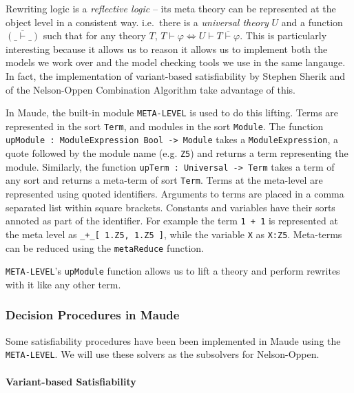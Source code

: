 \documentclass[]{article}
\let\oldparagraph\paragraph
\renewcommand{\paragraph}[1]{\oldparagraph{#1}\mbox{}}
\renewcommand \phi {\varphi}
\newcommand \proves   {{\vdash}}
\begin{document}
Rewriting logic is a \emph{reflective logic} -- its meta theory can be
represented at the object level in a consistent way. i.e.~there is a
\emph{universal theory} \(U\) and a function
\(\overline { ( \_ \proves \_ ) }\) such that for any theory \(T\),
\(T \proves \phi \iff U \proves \overline{ T \proves \phi }\). This is
particularly interesting because it allows us to reason it allows us to
implement both the models we work over and the model checking tools we
use in the same langauge. In fact, the implementation of variant-based
satisfiability by Stephen Sherik and of the Nelson-Oppen Combination
Algorithm take advantage of this.

In Maude, the built-in module \texttt{META-LEVEL} is used to do this
lifting. Terms are represented in the sort \texttt{Term}, and modules in
the sort \texttt{Module}. The function
\texttt{upModule\ :\ ModuleExpression\ Bool\ -\textgreater{}\ Module}
takes a \texttt{ModuleExpression}, a quote followed by the module name
(e.g. \texttt{\textquotesingle{}Z5}) and returns a term representing the
module. Similarly, the function
\texttt{upTerm\ :\ Universal\ -\textgreater{}\ Term} takes a term of any
sort and returns a meta-term of sort \texttt{Term}. Terms at the
meta-level are represented using quoted identifiers. Arguments to terms
are placed in a comma separated list within square brackets. Constants
and variables have their sorts annoted as part of the identifier. For
example the term \texttt{1\ +\ 1} is represented at the meta level as
\texttt{\textquotesingle{}\_+\_{[}\ \textquotesingle{}1.Z5,\ \textquotesingle{}1.Z5\ {]}},
while the variable \texttt{X} as \texttt{\textquotesingle{}X:Z5}.
Meta-terms can be reduced using the \texttt{metaReduce} function.

\texttt{META-LEVEL}'s \texttt{upModule} function allows us to lift a
theory and perform rewrites with it like any other term.

\hypertarget{decision-procedures-in-maude}{%
\subsubsection{Decision Procedures in
Maude}\label{decision-procedures-in-maude}}

Some satisfiability procedures have been been implemented in Maude using
the \texttt{META-LEVEL}. We will use these solvers as the subsolvers for
Nelson-Oppen.

\hypertarget{variant-based-satisfiability}{%
\paragraph{Variant-based
Satisfiability}\label{variant-based-satisfiability}}
\end{document}
